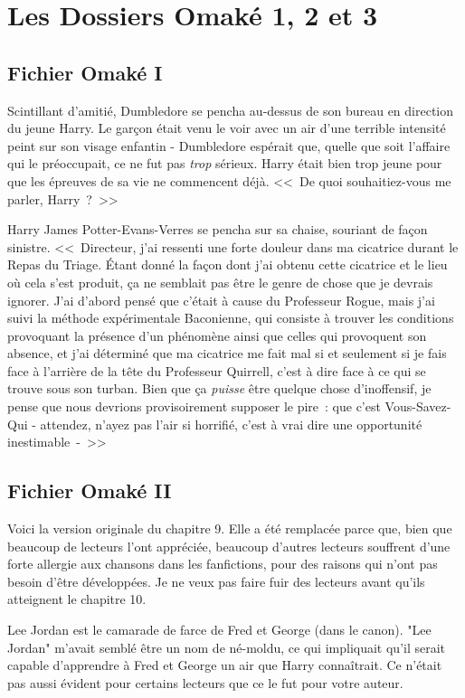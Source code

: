 \chapter{Les Dossiers Omaké 1, 2 et 3}

\section{Fichier Omaké I}

Scintillant d'amitié, Dumbledore se pencha au-dessus de son bureau en direction du jeune Harry. Le garçon était venu le voir avec un air d'une terrible intensité peint sur son visage enfantin - Dumbledore espérait que, quelle que soit l'affaire qui le préoccupait, ce ne fut pas \emph{trop} sérieux. Harry était bien trop jeune pour que les épreuves de sa vie ne commencent déjà. <<~De quoi souhaitiez-vous me parler, Harry~?~>>

Harry James Potter-Evans-Verres se pencha sur sa chaise, souriant de façon sinistre. <<~Directeur, j'ai ressenti une forte douleur dans ma cicatrice durant le Repas du Triage. Étant donné la façon dont j'ai obtenu cette cicatrice et le lieu où cela s'est produit, ça ne semblait pas être le genre de chose que je devrais ignorer. J'ai d'abord pensé que c'était à cause du Professeur Rogue, mais j'ai suivi la méthode expérimentale Baconienne, qui consiste à trouver les conditions provoquant la présence d'un phénomène ainsi que celles qui provoquent son absence, et j'ai déterminé que ma cicatrice me fait mal si et seulement si je fais face à l'arrière de la tête du Professeur Quirrell, c'est à dire face à ce qui se trouve sous son turban. Bien que ça \emph{puisse} être quelque chose d'inoffensif, je pense que nous devrions provisoirement supposer le pire~: que c'est Vous-Savez-Qui - attendez, n'ayez pas l'air si horrifié, c'est à vrai dire une opportunité inestimable~-~>>

\section{Fichier Omaké II}

Voici la version originale du chapitre 9. Elle a été remplacée parce que, bien que beaucoup de lecteurs l'ont appréciée, beaucoup d'autres lecteurs souffrent d'une forte allergie aux chansons dans les fanfictions, pour des raisons qui n'ont pas besoin d'être développées. Je ne veux pas faire fuir des lecteurs avant qu'ils atteignent le chapitre 10.

Lee Jordan est le camarade de farce de Fred et George (dans le canon). "Lee Jordan" m'avait semblé être un nom de né-moldu, ce qui impliquait qu'il serait capable d'apprendre à Fred et George un air que Harry connaîtrait. Ce n'était pas aussi évident pour certains lecteurs que ce le fut pour votre auteur.

